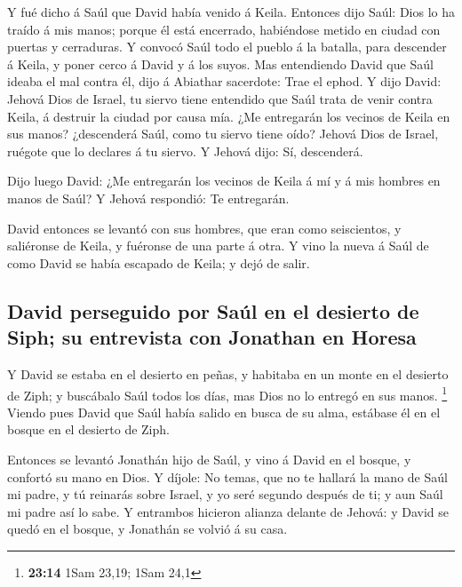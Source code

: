  Y fué dicho á Saúl que David había venido á Keila. Entonces
dijo Saúl: Dios lo ha traído á mis manos; porque él está encerrado,
habiéndose metido en ciudad con puertas y cerraduras.  Y
convocó Saúl todo el pueblo á la batalla, para descender á Keila, y
poner cerco á David y á los suyos.  Mas entendiendo David
que Saúl ideaba el mal contra él, dijo á Abiathar sacerdote: Trae el
ephod.  Y dijo David: Jehová Dios de Israel, tu siervo
tiene entendido que Saúl trata de venir contra Keila, á destruir la
ciudad por causa mía.  ¿Me entregarán los vecinos de Keila
en sus manos? ¿descenderá Saúl, como tu siervo tiene oído? Jehová Dios
de Israel, ruégote que lo declares á tu siervo. Y Jehová dijo: Sí,
descenderá.

 Dijo luego David: ¿Me entregarán los vecinos de Keila á mí
y á mis hombres en manos de Saúl? Y Jehová respondió: Te entregarán.

 David entonces se levantó con sus hombres, que eran como
seiscientos, y saliéronse de Keila, y fuéronse de una parte á otra. Y
vino la nueva á Saúl de como David se había escapado de Keila; y dejó de
salir.

\hypertarget{david-perseguido-por-sauxfal-en-el-desierto-de-siph-su-entrevista-con-jonathan-en-horesa}{%
\subsection{David perseguido por Saúl en el desierto de Siph; su
entrevista con Jonathan en
Horesa}\label{david-perseguido-por-sauxfal-en-el-desierto-de-siph-su-entrevista-con-jonathan-en-horesa}}

 Y David se estaba en el desierto en peñas, y habitaba en
un monte en el desierto de Ziph; y buscábalo Saúl todos los días, mas
Dios no lo entregó en sus manos. \footnote{\textbf{23:14} 1Sam 23,19;
  1Sam 24,1}  Viendo pues David que Saúl había salido en
busca de su alma, estábase él en el bosque en el desierto de Ziph.

 Entonces se levantó Jonathán hijo de Saúl, y vino á David
en el bosque, y confortó su mano en Dios.  Y díjole: No
temas, que no te hallará la mano de Saúl mi padre, y tú reinarás sobre
Israel, y yo seré segundo después de ti; y aun Saúl mi padre así lo
sabe.  Y entrambos hicieron alianza delante de Jehová: y
David se quedó en el bosque, y Jonathán se volvió á su casa.

